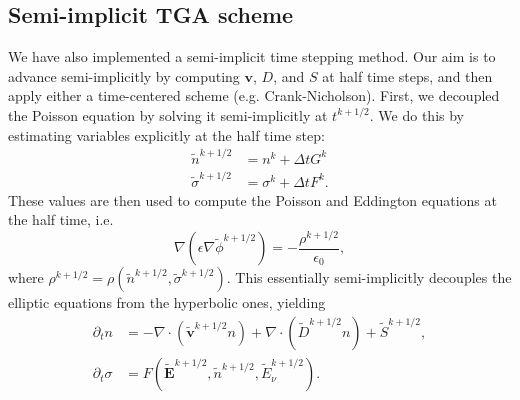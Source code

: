 \documentclass[3p]{elsarticle}
\begin{document}
\subsection{Semi-implicit TGA scheme}
We have also implemented a semi-implicit time stepping method. Our aim is to advance semi-implicitly by computing $\bm{v}$, $D$, and $S$ at half time steps, and then apply either a time-centered scheme (e.g. Crank-Nicholson). First, we decoupled the Poisson equation by solving it semi-implicitly at $t^{k+1/2}$. We do this by estimating variables explicitly at the half time step:
\begin{subequations}
  \begin{align}
    \widetilde{n}^{k+1/2} &= n^k + \Delta t G^k \\
    \widetilde{\sigma}^{k+1/2} &= \sigma^k + \Delta t F^k. 
  \end{align}
\end{subequations}
These values are then used to compute the Poisson and Eddington equations at the half time, i.e.
\begin{equation}
  \nabla\left(\epsilon\nabla\widetilde{\phi}^{k+1/2}\right) = -\frac{\rho^{k+1/2}}{\epsilon_0},
\end{equation}
where $\rho^{k+1/2} = \rho\left(\widetilde{n}^{k+1/2}, \widetilde{\sigma}^{k+1/2}\right)$. This essentially semi-implicitly decouples the elliptic equations from the hyperbolic ones, yielding
\begin{subequations}
  \begin{align}
    \partial_t n &= -\nabla\cdot\left(\widetilde{\bm{v}}^{k+1/2}n\right) + \nabla\cdot\left(\widetilde{D}^{k+1/2}n\right) + \widetilde{S}^{k+1/2}, \\
    \partial_t \sigma &= F\left(\widetilde{\bm{E}}^{k+1/2}, \widetilde{n}^{k+1/2}, \widetilde{E}_\nu^{k+1/2}\right).
  \end{align}
\end{subequations}




\end{document}
